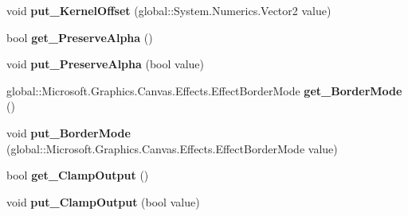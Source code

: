 \begin{DoxyCompactItemize}
\mbox{\label{class_microsoft_1_1_graphics_1_1_canvas_1_1_effects_1_1_convolve_matrix_effect_a3a91dc58b0592464768418874a11cf46}} 
void {\bfseries put\+\_\+\+Kernel\+Offset} (global\+::\+System.\+Numerics.\+Vector2 value)
\item 
\mbox{\label{class_microsoft_1_1_graphics_1_1_canvas_1_1_effects_1_1_convolve_matrix_effect_a6c45f03f2bdf0174e804e97ef308a43c}} 
bool {\bfseries get\+\_\+\+Preserve\+Alpha} ()
\item 
\mbox{\label{class_microsoft_1_1_graphics_1_1_canvas_1_1_effects_1_1_convolve_matrix_effect_a7ff28376e85f7e4262710a6e5364f86b}} 
void {\bfseries put\+\_\+\+Preserve\+Alpha} (bool value)
\item 
\mbox{\label{class_microsoft_1_1_graphics_1_1_canvas_1_1_effects_1_1_convolve_matrix_effect_adbefe36f124d91b48f6852745d9d9481}} 
global\+::\+Microsoft.\+Graphics.\+Canvas.\+Effects.\+Effect\+Border\+Mode {\bfseries get\+\_\+\+Border\+Mode} ()
\item 
\mbox{\label{class_microsoft_1_1_graphics_1_1_canvas_1_1_effects_1_1_convolve_matrix_effect_ace47dc75de05d5c68030464a1c59cada}} 
void {\bfseries put\+\_\+\+Border\+Mode} (global\+::\+Microsoft.\+Graphics.\+Canvas.\+Effects.\+Effect\+Border\+Mode value)
\item 
\mbox{\label{class_microsoft_1_1_graphics_1_1_canvas_1_1_effects_1_1_convolve_matrix_effect_a0f7dfb640c60f46c101101863ff9ee62}} 
bool {\bfseries get\+\_\+\+Clamp\+Output} ()
\item 
\mbox{\label{class_microsoft_1_1_graphics_1_1_canvas_1_1_effects_1_1_convolve_matrix_effect_a290fd5239a39bf63799d62e94e50f048}} 
void {\bfseries put\+\_\+\+Clamp\+Output} (bool value)

\end{DoxyCompactItemize}
